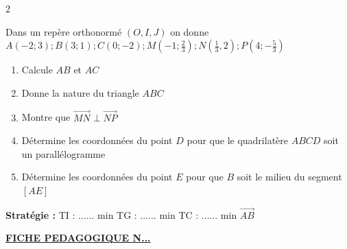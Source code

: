 \begin{multicols*}{2}
\begin{enumerate}
  		
  	\end{enumerate}
  	 Dans un repère orthonormé $(O, I, J)$ on donne
  	$A(-2; 3); B(3; 1); C(0; -2); M(-1; \frac{2}{3}); N(\frac{1}{3}, 2); P(4; -\frac{5}{3})$
  	\begin{enumerate}
  		\item Calcule $AB$ et $AC$
  		\item Donne la nature du triangle $ABC$
  		\item Montre que $\overrightarrow{MN} \perp \overrightarrow{NP}$
  		\item Détermine les coordonnées du point $ D $ pour que le quadrilatère $ABCD $ soit un parallélogramme 
  		\item Détermine les coordonnées du point $ E $ pour que $ B $ soit le milieu du segment $ [AE] $
  	\end{enumerate}
  	\textbf{Stratégie :} TI : ...... min \quad TG : ...... min \quad TC : ...... min
  	$\overrightarrow{AB}$ 
  	
  \end{multicols*}
   \newpage
 \begin{center}
 	\underline{\textbf{\Large FICHE PEDAGOGIQUE N...}}
 \end{center}
